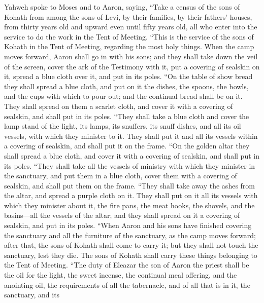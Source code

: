  Yahweh spoke to Moses and to Aaron, saying,
 ``Take a census of the sons of Kohath from among the sons
of Levi, by their families, by their fathers' houses, 
from thirty years old and upward even until fifty years old, all who
enter into the service to do the work in the Tent of Meeting.
 ``This is the service of the sons of Kohath in the Tent
of Meeting, regarding the most holy things.  When the camp
moves forward, Aaron shall go in with his sons; and they shall take down
the veil of the screen, cover the ark of the Testimony with it,
 put a covering of sealskin on it, spread a blue cloth
over it, and put in its poles.  ``On the table of show
bread they shall spread a blue cloth, and put on it the dishes, the
spoons, the bowls, and the cups with which to pour out; and the
continual bread shall be on it.  They shall spread on them
a scarlet cloth, and cover it with a covering of sealskin, and shall put
in its poles.  ``They shall take a blue cloth and cover
the lamp stand of the light, its lamps, its snuffers, its snuff dishes,
and all its oil vessels, with which they minister to it. 
They shall put it and all its vessels within a covering of sealskin, and
shall put it on the frame.  ``On the golden altar they
shall spread a blue cloth, and cover it with a covering of sealskin, and
shall put in its poles.  ``They shall take all the
vessels of ministry with which they minister in the sanctuary, and put
them in a blue cloth, cover them with a covering of sealskin, and shall
put them on the frame.  ``They shall take away the ashes
from the altar, and spread a purple cloth on it.  They
shall put on it all its vessels with which they minister about it, the
fire pans, the meat hooks, the shovels, and the basins---all the vessels
of the altar; and they shall spread on it a covering of sealskin, and
put in its poles.  ``When Aaron and his sons have
finished covering the sanctuary and all the furniture of the sanctuary,
as the camp moves forward; after that, the sons of Kohath shall come to
carry it; but they shall not touch the sanctuary, lest they die. The
sons of Kohath shall carry these things belonging to the Tent of
Meeting.  ``The duty of Eleazar the son of Aaron the
priest shall be the oil for the light, the sweet incense, the continual
meal offering, and the anointing oil, the requirements of all the
tabernacle, and of all that is in it, the sanctuary, and its
